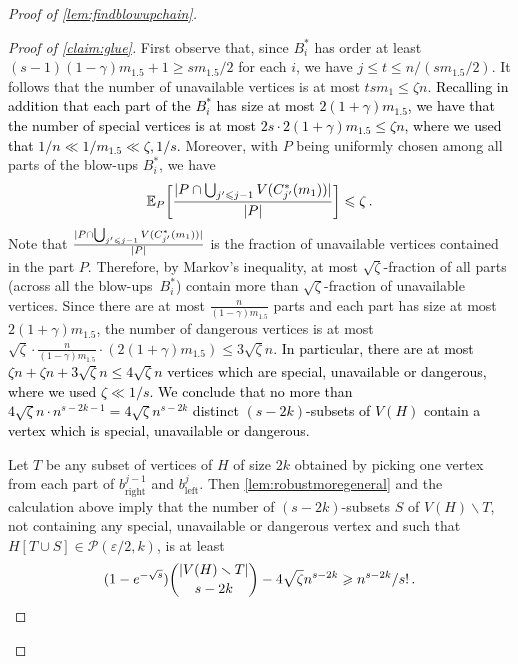 \documentclass[12pt,reqno]{amsart}
\theoremstyle{plain}
\theoremstyle{definition}
\numberwithin{equation}{section}
\newcommand{\fw}[1]{\textcolor{black}{#1}}
\DeclarePairedDelimiter{\abs}{\lvert}{\rvert}
\renewcommand{\ge}{\geqslant}
\renewcommand{\le}{\leqslant}
\renewcommand{\geq}{\geqslant}
\renewcommand{\leq}{\leqslant}
\renewcommand{\setminus}{\smallsetminus}
\newcommand{\eps}{\varepsilon}
\begin{document}
\begin{proof}[Proof of \cref{lem:findblowupchain}]
\begin{proof}[Proof of \cref{claim:glue}]
			First observe that, since $B_i^\ast$ has order at least $(s-1)(1-\gamma)m_{1.5}+1 \geq sm_{1.5}/2$ for each $i$, we have $j \le t\leq n/(sm_{1.5}/2)$.
			It follows that the number of unavailable vertices is at most $t sm_1 \leq \zeta n$.
			\fw{Recalling in addition that each part of the $B_i^\ast$ has size at most $2(1+\gamma)m_{1.5}$, we have that the number of special vertices is at most $2s  \cdot 2(1+\gamma)m_{1.5} \le \zeta n$, where we used that $1/n \ll 1/m_{1.5} \ll \zeta,1/s$.}
			Moreover, with $P$ being uniformly chosen among all parts of the blow-ups $B_i^\ast$, we have
			\begin{equation*}
				\mathbb{E}_P \biggl[\frac{\abs{P\cap \bigcup_{j'\leq j-1} V(C_{j'}^\ast(m_1))}}{\abs{P}}\biggr] \leq \zeta\, .
			\end{equation*}
			Note that $\frac{\abs{P\cap \bigcup_{j'\leq j-1} V(C_{j'}^\ast(m_1))}}{\abs{P}}$ is the fraction of unavailable vertices contained in the part $P$.
			Therefore, by Markov's inequality, at most $\sqrt{\zeta}$-fraction of all parts (across all the blow-ups~$B_i^\ast$) contain more than $\sqrt{\zeta}$-fraction of unavailable vertices. Since  there are at most $\frac{n}{(1-\gamma)m_{1.5}}$ parts and each part has size at most $2(1+\gamma)m_{1.5}$, the number of dangerous vertices is at most $\sqrt{\zeta} \cdot \frac{n}{(1-\gamma)m_{1.5}} \cdot (2(1+\gamma)m_{1.5}) \le 3\sqrt{\zeta}n$.
			\fw{In particular, there are at most $ \zeta n + \zeta n+3\sqrt{\zeta}n\le  4\sqrt{\zeta} n$ vertices which are special, unavailable or dangerous, where we used $\zeta \ll 1/s$. We conclude that no more than $4\sqrt{\zeta} n \cdot n^{s-2k - 1} = 4\sqrt{\zeta} n^{s-2k}$ distinct $(s-2k)$-subsets of $V(H)$ contain a vertex which is special, unavailable or dangerous.}
			
			Let $T$ be any subset of vertices of $H$ of size $2k$ obtained by picking one vertex from each part of $b^{j-1}_{\text{right}}$ and $b^{j}_{\text{left}}$.
			Then \cref{lem:robustmoregeneral} and the calculation above imply that the number of  $(s-2k)$-subsets $S$ of $V(H) \setminus T$, not containing any special, unavailable or dangerous vertex and such that $H[T\cup S]\in \mathcal{P}(\eps/2,k)$, is at least
			\begin{equation}
				\label{eq:lemma3.3_applicable}
				\fw{(1-e^{-\sqrt{s}}) \binom{\abs{V(H) \setminus T}}{s-2k} - 4\sqrt{\zeta} n^{s-2k} \ge n^{s-2k}/s!\, .}
			\end{equation}
			

\end{proof}
\end{proof}
\end{document}
